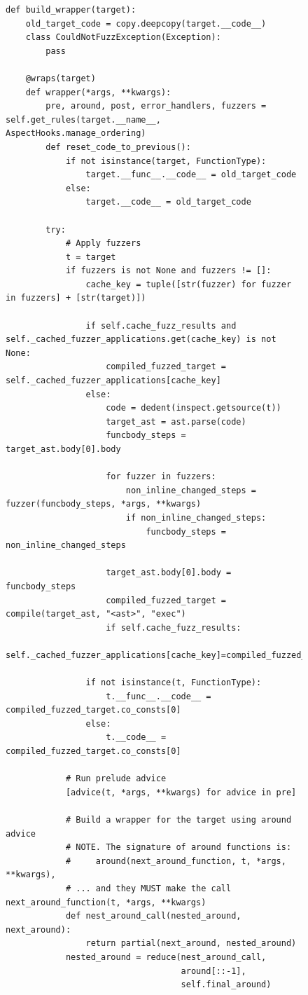 \begin{figure}
    \centering
    \begin{lstlisting}[style=footnotesize_python]
def build_wrapper(target):
    old_target_code = copy.deepcopy(target.__code__)
    class CouldNotFuzzException(Exception):
        pass

    @wraps(target)
    def wrapper(*args, **kwargs):
        pre, around, post, error_handlers, fuzzers = self.get_rules(target.__name__, AspectHooks.manage_ordering)
        def reset_code_to_previous():
            if not isinstance(target, FunctionType):
                target.__func__.__code__ = old_target_code
            else:
                target.__code__ = old_target_code

        try:
            # Apply fuzzers
            t = target
            if fuzzers is not None and fuzzers != []:
                cache_key = tuple([str(fuzzer) for fuzzer in fuzzers] + [str(target)])

                if self.cache_fuzz_results and self._cached_fuzzer_applications.get(cache_key) is not None:
                    compiled_fuzzed_target = self._cached_fuzzer_applications[cache_key]
                else:
                    code = dedent(inspect.getsource(t))
                    target_ast = ast.parse(code)
                    funcbody_steps = target_ast.body[0].body

                    for fuzzer in fuzzers:
                        non_inline_changed_steps = fuzzer(funcbody_steps, *args, **kwargs)
                        if non_inline_changed_steps:
                            funcbody_steps = non_inline_changed_steps

                    target_ast.body[0].body = funcbody_steps
                    compiled_fuzzed_target = compile(target_ast, "<ast>", "exec")
                    if self.cache_fuzz_results:
                        self._cached_fuzzer_applications[cache_key]=compiled_fuzzed_target

                if not isinstance(t, FunctionType):
                    t.__func__.__code__ =  compiled_fuzzed_target.co_consts[0]
                else:
                    t.__code__ = compiled_fuzzed_target.co_consts[0]

            # Run prelude advice
            [advice(t, *args, **kwargs) for advice in pre]

            # Build a wrapper for the target using around advice
            # NOTE. The signature of around functions is:
            #     around(next_around_function, t, *args, **kwargs),
            # ... and they MUST make the call next_around_function(t, *args, **kwargs)
            def nest_around_call(nested_around, next_around):
                return partial(next_around, nested_around)
            nested_around = reduce(nest_around_call,
                                   around[::-1],
                                   self.final_around)


\end{lstlisting}
\end{figure}
